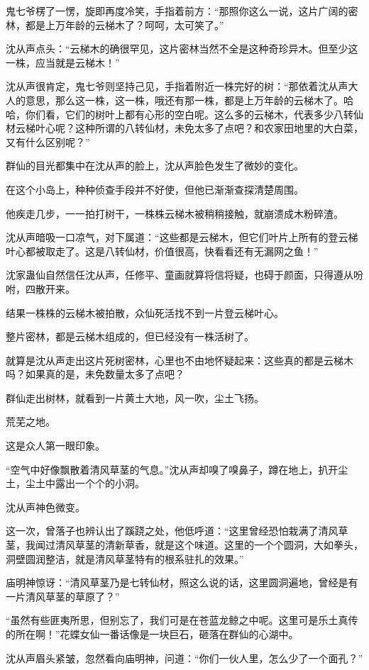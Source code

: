 \begin{this_body}
鬼七爷楞了一愣，旋即再度冷笑，手指着前方：“那照你这么一说，这片广阔的密林，都是上万年龄的云梯木了？呵呵，太可笑了。”

沈从声点头：“云梯木的确很罕见，这片密林当然不全是这种奇珍异木。但至少这一株，应当就是云梯木！”

沈从声很肯定，鬼七爷则坚持己见，手指着附近一株完好的树：“那依着沈从声大人的意思，那么这一株，这一株，哦还有那一株，都是上万年龄的云梯木了。哈哈，你们看，它们的树叶上都有心形的空白呢。这么多的云梯木，代表多少八转仙材云梯叶心呢？这种所谓的八转仙材，未免太多了点吧？和农家田地里的大白菜，又有什么区别呢？”

群仙的目光都集中在沈从声的脸上，沈从声脸色发生了微妙的变化。

在这个小岛上，种种侦查手段并不好使，但他已渐渐查探清楚周围。

他疾走几步，一一拍打树干，一株株云梯木被稍稍接触，就崩溃成木粉碎渣。

沈从声暗吸一口凉气，对下属道：“这些都是云梯木，但它们叶片上所有的登云梯叶心都被取走了。这是八转仙材，价值很高，快看看还有无漏网之鱼！”

沈家蛊仙自然信任沈从声，任修平、童画就算将信将疑，也碍于颜面，只得遵从吩咐，四散开来。

结果一株株的云梯木被拍散，众仙死活找不到一片登云梯叶心。

整片密林，都是云梯木组成的，但已经没有一株活树了。

就算是沈从声走出这片死树密林，心里也不由地怀疑起来：这些真的都是云梯木吗？如果真的是，未免数量太多了点吧？

群仙走出树林，就看到一片黄土大地，风一吹，尘土飞扬。

荒芜之地。

这是众人第一眼印象。

“空气中好像飘散着清风草茎的气息。”沈从声却嗅了嗅鼻子，蹲在地上，扒开尘土，尘土中露出一个个的小洞。

沈从声神色微变。

这一次，曾落子也辨认出了蹊跷之处，他低呼道：“这里曾经恐怕栽满了清风草茎，我闻过清风草茎的清新草香，就是这个味道。这里的一个个圆洞，大如拳头，洞壁圆润整洁，就是清风草茎特有的根系驻扎的效果。”

庙明神惊讶：“清风草茎乃是七转仙材，照这么说的话，这里圆洞遍地，曾经是有一片清风草茎的草原了？”

“虽然有些匪夷所思，但别忘了，我们可是在苍蓝龙鲸之中呢。这里可是乐土真传的所在啊！”花蝶女仙一番话像是一块巨石，砸落在群仙的心湖中。

沈从声眉头紧皱，忽然看向庙明神，问道：“你们一伙人里，怎么少了一个面孔？”


\end{this_body}
